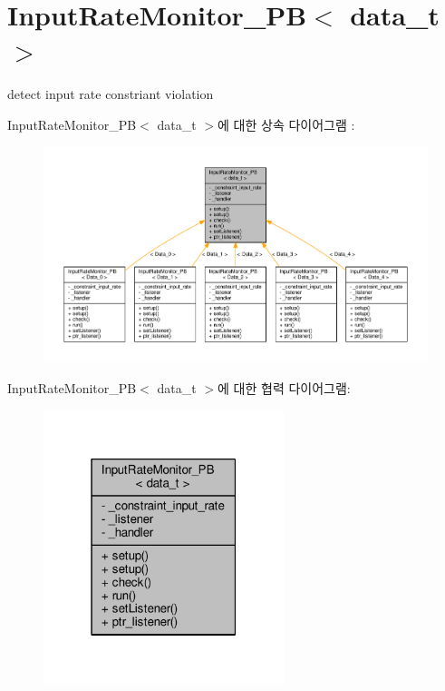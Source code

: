 \hypertarget{classInputRateMonitor__PB}{}\section{Input\+Rate\+Monitor\+\_\+\+PB$<$ data\+\_\+t $>$}
\label{classInputRateMonitor__PB}


detect input rate constriant violation  




Input\+Rate\+Monitor\+\_\+\+PB$<$ data\+\_\+t $>$에 대한 상속 다이어그램 \+: \nopagebreak
\begin{figure}[H]
\begin{center}
\leavevmode
\includegraphics[width=350pt]{classInputRateMonitor__PB__inherit__graph}
\end{center}
\end{figure}


Input\+Rate\+Monitor\+\_\+\+PB$<$ data\+\_\+t $>$에 대한 협력 다이어그램\+:\nopagebreak
\begin{figure}[H]
\begin{center}
\leavevmode
\includegraphics[width=199pt]{classInputRateMonitor__PB__coll__graph}
\end{center}
\end{figure}
